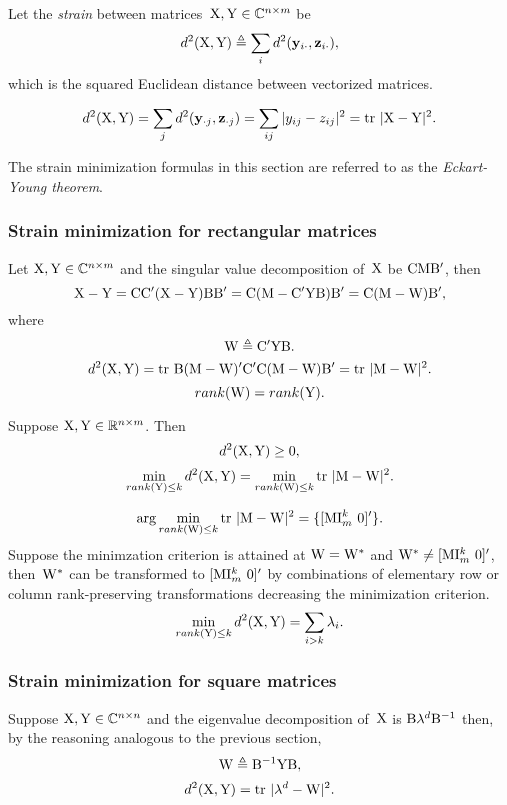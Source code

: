\documentclass[10pt,a4paper]{article}
\theoremstyle{plain} \newtheorem{Lem}{Lemma}
\begin{document}
Let the {\em strain} between matrices~$\mathrm X, \mathrm Y \in \mathbb C^{n \times m}$ be
$$ d^2(\mathrm X,\mathrm Y) \triangleq \sum_i d^2(\mathbf y_{i \cdot}, \mathbf z_{i \cdot}), $$
which is the squared Euclidean distance between vectorized matrices.

$$ d^2(\mathrm X,\mathrm Y) = \sum_j d^2(\mathbf y_{\cdot j}, \mathbf z_{\cdot j}) = \sum_{ij} |y_{ij} - z_{ij}|^2 = \mathrm {tr} \  |\mathrm X - \mathrm Y|^2. $$

The strain minimization formulas in this section are referred to as the {\em Eckart-Young theorem}.


\subsubsection{Strain minimization for rectangular matrices}

Let $\mathrm X, \mathrm Y \in \mathbb C^{n \times m}$ and the singular value decomposition of~$\mathrm X$ be $\mathrm C \mathrm M \mathrm B'$,
then 
$$ \mathrm X - \mathrm Y = \mathrm C \mathrm C' (\mathrm X - \mathrm Y) \mathrm B \mathrm B' = \mathrm C (\mathrm M - \mathrm C' \mathrm Y \mathrm B) \mathrm B' = \mathrm C (\mathrm M - \mathrm W) \mathrm B', $$
where 
$$ \mathrm W \triangleq \mathrm C' \mathrm Y \mathrm B. $$
$$ d^2(\mathrm X,\mathrm Y) = \mathrm {tr} \  \mathrm B (\mathrm M - \mathrm W)' \mathrm C' \mathrm C (\mathrm M - \mathrm W) \mathrm B' = \mathrm {tr} \  |\mathrm M -\mathrm W|^2 . $$
$$ rank(\mathrm W) = rank(\mathrm Y). $$

Suppose $\mathrm X, \mathrm Y \in \mathbb R^{n \times m}$.
Then
$$ d^2(\mathrm X,\mathrm Y) \ge 0, $$
$$ \min_{rank(\mathrm Y) \le k} d^2 (\mathrm X, \mathrm Y) = \min_{rank(\mathrm W) \le k} \mathrm {tr} \  |\mathrm M -\mathrm W|^2. $$

$$ \arg \min_{rank(\mathrm W) \le k} \mathrm {tr} \  |\mathrm M -\mathrm W|^2 = \{[\mathrm M \mathrm I_m^k \ \mathrm 0]' \} . $$
\proof
{ Suppose the minimzation criterion is attained at $\mathrm W = \mathrm W^*$ and $\mathrm W^* \ne [\mathrm M \mathrm I_m^k \ \mathrm 0]'$,
then~$\mathrm W^*$ can be transformed to $[\mathrm M \mathrm I_m^k \ \mathrm 0]'$ 
by combinations of elementary row or column rank-preserving transformations 
decreasing the minimization criterion.
}
$$ \min_{rank(\mathrm Y) \le k} d^2 (\mathrm X, \mathrm Y) = \sum_{i > k} \lambda_i. $$


\subsubsection{Strain minimization for square matrices}
Suppose $\mathrm X, \mathrm Y \in \mathbb C^{n \times n}$ and the eigenvalue decomposition of~$\mathrm X$ is $\mathrm B \mathbf \lambda^d \mathrm B^{-1}$ 
then, 
by the reasoning analogous to the previous section,
$$ \mathrm W \triangleq \mathrm B^{-1} \mathrm Y \mathrm B, $$
$$ d^2(\mathrm X,\mathrm Y) = \mathrm {tr} \  |\mathbf \lambda^d -\mathrm W|^2. $$
\end{document}
